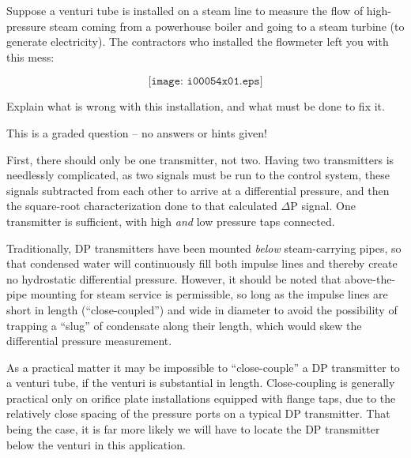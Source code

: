 

Suppose a venturi tube is installed on a steam line to measure the flow of high-pressure steam coming from a powerhouse boiler and going to a steam turbine (to generate electricity).  The contractors who installed the flowmeter left you with this mess:

$$\texttt{[image: i00054x01.eps]}$$

Explain what is wrong with this installation, and what must be done to fix it.

\vfil

\eject






This is a graded question -- no answers or hints given!







First, there should only be one transmitter, not two.  Having two transmitters is needlessly complicated, as two signals must be run to the control system, these signals subtracted from each other to arrive at a differential pressure, and then the square-root characterization done to that calculated $\Delta$P signal.  One transmitter is sufficient, with high {\it and} low pressure taps connected.

\vskip 10pt

Traditionally, DP transmitters have been mounted {\it below} steam-carrying pipes, so that condensed water will continuously fill both impulse lines and thereby create no hydrostatic differential pressure.  However, it should be noted that above-the-pipe mounting for steam service is permissible, so long as the impulse lines are short in length (``close-coupled'') and wide in diameter to avoid the possibility of trapping a ``slug'' of condensate along their length, which would skew the differential pressure measurement.

As a practical matter it may be impossible to ``close-couple'' a DP transmitter to a venturi tube, if the venturi is substantial in length.  Close-coupling is generally practical only on orifice plate installations equipped with flange taps, due to the relatively close spacing of the pressure ports on a typical DP transmitter.  That being the case, it is far more likely we will have to locate the DP transmitter below the venturi in this application.

